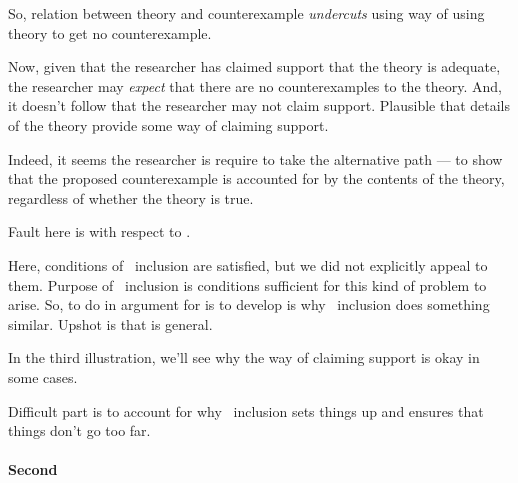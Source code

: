 \begin{note}
  So, relation between theory and counterexample \emph{undercuts} using way of using theory to get no counterexample.

  Now, given that the researcher has claimed support that the theory is adequate, the researcher may \emph{expect} that there are no counterexamples to the theory.
  And, it doesn't follow that the researcher may not claim support.
  Plausible that details of the theory provide some way of claiming support.

  Indeed, it seems the researcher is require to take the alternative path --- to show that the proposed counterexample is accounted for by the contents of the theory, regardless of whether the theory is true.

  Fault here is with respect to \ideaCS{}.
  {
    \color{red}
    Here, conditions of~{\color{red} inclusion} are satisfied, but we did not explicitly appeal to them.
    Purpose of~{\color{red} inclusion} is conditions sufficient for this kind of problem to arise.
    So, to do in argument for \nI{} is to develop is why~{\color{red} inclusion} does something similar.
    Upshot is that \nI{} is general.

    In the third illustration, we'll see why the way of claiming support is okay in some cases.
  }
  Difficult part is to account for why~{\color{red} inclusion} sets things up and ensures that things don't go too far.
\end{note}

\paragraph{Second}


